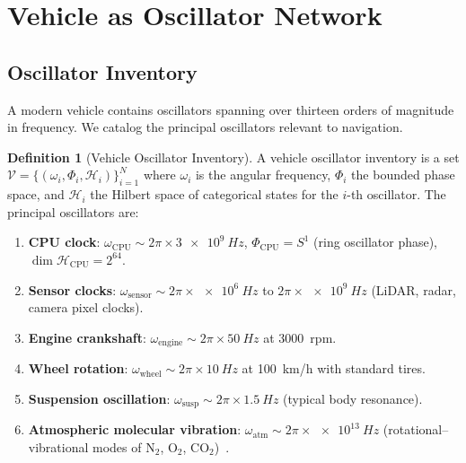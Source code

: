 \documentclass[twocolumn,10pt]{article}
\theoremstyle{definition}
\newtheorem{definition}[theorem]{Definition}
\theoremstyle{remark}
\begin{document}
\section{Vehicle as Oscillator Network}\label{sec:vehicle-oscillator}

\subsection{Oscillator Inventory}

A modern vehicle contains oscillators spanning over thirteen orders of
magnitude in frequency. We catalog the principal oscillators relevant to
navigation.

\begin{definition}[Vehicle Oscillator Inventory]\label{def:osc-inventory}
A vehicle oscillator inventory is a set
$\mathcal{V} = \{(\omega_i, \Phi_i, \mathcal{H}_i)\}_{i=1}^{N}$
where $\omega_i$ is the angular frequency, $\Phi_i$ the bounded phase
space, and $\mathcal{H}_i$ the Hilbert space of categorical states for the
$i$-th oscillator. The principal oscillators are:
\begin{enumerate}[label=(\roman*)]
  \item \textbf{CPU clock}: $\omega_{\mathrm{CPU}} \sim 2\pi \times
    \SI{3e9}{Hz}$, $\Phi_{\mathrm{CPU}} = S^1$ (ring oscillator phase),
    $\dim \mathcal{H}_{\mathrm{CPU}} = 2^{64}$.
  \item \textbf{Sensor clocks}: $\omega_{\mathrm{sensor}} \sim 2\pi \times
    \SI{e6}{Hz}$ to $2\pi \times \SI{e9}{Hz}$ (LiDAR, radar, camera pixel
    clocks).
  \item \textbf{Engine crankshaft}: $\omega_{\mathrm{engine}} \sim 2\pi
    \times \SI{50}{Hz}$ at \SI{3000}{rpm}.
  \item \textbf{Wheel rotation}: $\omega_{\mathrm{wheel}} \sim 2\pi \times
    \SI{10}{Hz}$ at \SI{100}{km/h} with standard tires.
  \item \textbf{Suspension oscillation}: $\omega_{\mathrm{susp}} \sim 2\pi
    \times \SI{1.5}{Hz}$ (typical body resonance).
  \item \textbf{Atmospheric molecular vibration}: $\omega_{\mathrm{atm}}
    \sim 2\pi \times \SI{e13}{Hz}$ (rotational--vibrational modes of
    N$_2$, O$_2$, CO$_2$)~\cite{herzberg1945}.
\end{enumerate}
\end{definition}
\end{document}
